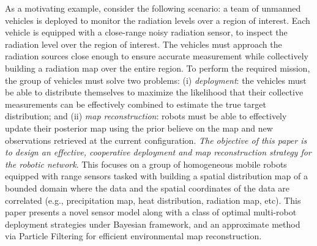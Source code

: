 \documentclass[letterpaper, 10 pt, conference]{ieeeconf}
\newcommand{\Ram}[1]{{\normalsize{\textbf{({\color{green}Ram:\ }#1)}}}}
\begin{document}
As a motivating example, consider the following scenario: a team of unmanned vehicles is deployed to monitor the radiation levels over a region of interest. 
Each vehicle is equipped with a close-range noisy radiation sensor, to inspect the radiation level over the region of interest. 
The vehicles must approach the radiation sources close enough to ensure accurate measurement while collectively building a radiation map over the entire region.
To perform the required mission, the group of vehicles must solve two problems: (i) \emph{deployment}: the vehicles must be able to distribute themselves to maximize the likelihood that their collective measurements can be effectively combined to estimate the true target distribution; and (ii) \emph{map reconstruction}: robots must be able to effectively update their posterior map using the prior believe on the map and new observations retrieved at the current configuration. 
\emph{The objective of this paper is to design an effective, cooperative deployment and map reconstruction strategy for the robotic network}.
This focuses on a group of homogeneous mobile robots equipped with range sensors tasked with building a spatial distribution map of a bounded domain where the data and the spatial coordinates of the data are correlated (e.g., precipitation map, heat distribution, radiation map, etc).
This paper presents a novel sensor model along with a class of optimal multi-robot deployment strategies under Bayesian framework, and an approximate method via Particle Filtering for efficient environmental map reconstruction.


\end{document}

